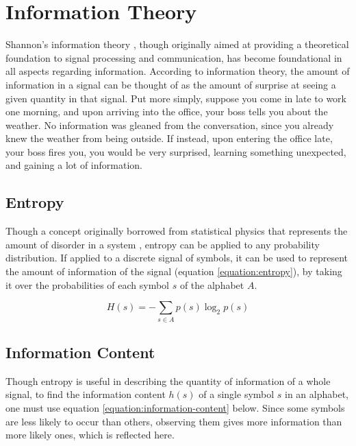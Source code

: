 \section{Information Theory}
\label{section:information-theory}

Shannon's information theory \cite{shannon1948mathematical}, though originally aimed at providing a theoretical foundation to signal processing and communication, has become foundational in all aspects regarding information.  According to information theory, the amount of information in a signal can be thought of as the amount of surprise at seeing a given quantity in that signal.  Put more simply, suppose you come in late to work one morning, and upon arriving into the office, your boss tells you about the weather. No information was gleaned from the conversation, since you already knew the weather from being outside.  If instead, upon entering the office late, your boss fires you, you would be very surprised, learning something unexpected, and gaining a lot of information.

\subsection{Entropy}
\label{subsection:entropy}

Though a concept originally borrowed from statistical physics that represents the amount of disorder in a system \cite{boltzmann1970weitere}, entropy can be applied to any probability distribution.  If applied to a discrete signal of symbols, it can be used to represent the amount of information of the signal (equation \ref{equation:entropy}), by taking it over the probabilities of each symbol $s$ of the alphabet $A$.

\begin{equation}
  \label{equation:entropy}
  H(s) = - \sum_{s \in A} p(s) \log_2 p(s)
\end{equation}

\subsection{Information Content}
\label{subsection:information-content}

Though entropy is useful in describing the quantity of information of a whole signal, to find the information content $h(s)$ of a single symbol $s$ in an alphabet, one must use equation \ref{equation:information-content} below. Since some symbols are less likely to occur than others, observing them gives more information than more likely ones, which is reflected here.

